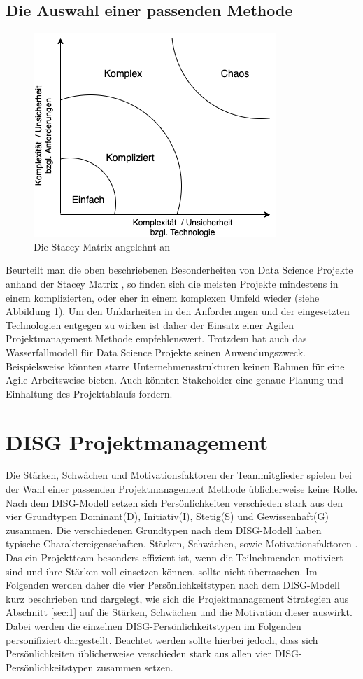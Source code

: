 \documentclass[twocolumn,10pt]{asme2ej}
\begin{document}
\subsection{Die Auswahl einer passenden Methode}

\begin{figure}
	\includegraphics[scale=0.55]{stacey.png}
	\caption[center]{Die Stacey Matrix angelehnt an \cite{stacey_img}}
	\label{fig:stacey}
\end{figure}


Beurteilt man die oben beschriebenen Besonderheiten von Data Science Projekte anhand der Stacey Matrix \cite{Stacey2011StrategicMA}, so finden sich die meisten Projekte mindestens in einem komplizierten, oder eher in einem komplexen Umfeld wieder (siehe Abbildung \ref{fig:stacey}). Um den Unklarheiten in den Anforderungen und der eingesetzten Technologien entgegen zu wirken ist daher der Einsatz einer Agilen Projektmanagement Methode empfehlenswert. Trotzdem hat auch das Wasserfallmodell für Data Science Projekte seinen Anwendungszweck. Beispielsweise könnten starre Unternehmensstrukturen keinen Rahmen für eine Agile Arbeitsweise bieten. Auch könnten Stakeholder eine genaue Planung und Einhaltung des Projektablaufs fordern. 

\section{DISG Projektmanagement}\label{sec:2}
Die Stärken, Schwächen und Motivationsfaktoren der Teammitglieder spielen bei der Wahl einer passenden Projektmanagement Methode üblicherweise keine Rolle. Nach dem  DISG-Modell setzen sich Persönlichkeiten verschieden stark aus den vier Grundtypen Dominant(D), Initiativ(I), Stetig(S) und Gewissenhaft(G) zusammen. Die verschiedenen Grundtypen nach dem DISG-Modell haben typische Charaktereigenschaften, Stärken, Schwächen, sowie Motivationsfaktoren \cite{disc}. Das ein Projektteam besonders effizient ist, wenn die Teilnehmenden motiviert sind und ihre Stärken voll einsetzen können, sollte nicht überraschen. Im Folgenden werden daher die vier Persönlichkeitstypen nach dem DISG-Modell kurz beschrieben und dargelegt, wie sich die Projektmanagement Strategien aus Abschnitt \ref{sec:1} auf die Stärken, Schwächen und die Motivation dieser auswirkt. Dabei werden die einzelnen DISG-Persönlichkeitstypen im Folgenden personifiziert dargestellt. Beachtet werden sollte hierbei jedoch, dass sich Persönlichkeiten üblicherweise verschieden stark aus allen vier DISG-Persönlichkeitstypen zusammen setzen.
\end{document}
